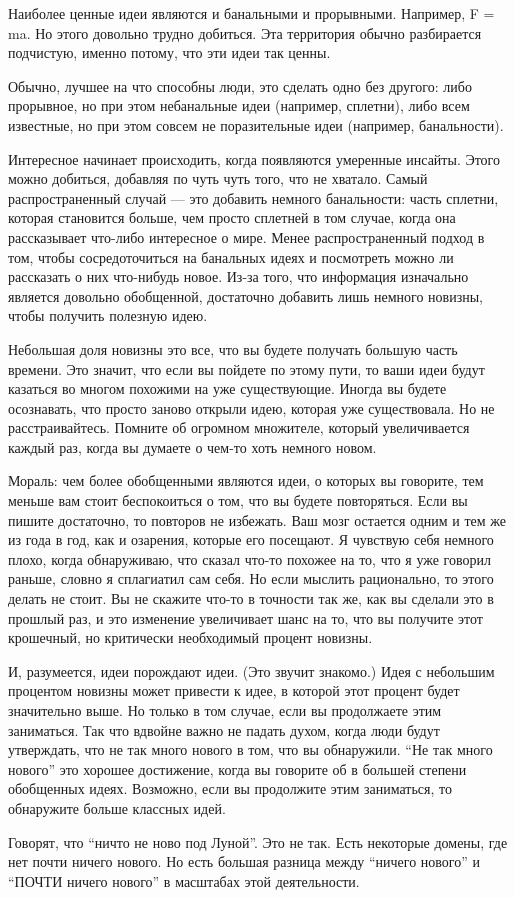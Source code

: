 \documentclass[ebook,12pt,oneside,openany]{memoir}
\date{}
\begin{document}
\maketitle

Наиболее ценные идеи являются и банальными и прорывными. Например, F =
ma. Но этого довольно трудно добиться. Эта территория обычно
разбирается подчистую, именно потому, что эти идеи так ценны.

Обычно, лучшее на что способны люди, это сделать одно без другого:
либо прорывное, но при этом небанальные идеи (например, сплетни), либо
всем известные, но при этом совсем не поразительные идеи (например,
банальности).

Интересное начинает происходить, когда появляются умеренные инсайты.
Этого можно добиться, добавляя по чуть чуть того, что не хватало.
Самый распространенный случай — это добавить немного банальности:
часть сплетни, которая становится больше, чем просто сплетней в том
случае, когда она рассказывает что-либо интересное о мире. Менее
распространенный подход в том, чтобы сосредоточиться на банальных
идеях и посмотреть можно ли рассказать о них что-нибудь новое. Из-за
того, что информация изначально является довольно обобщенной,
достаточно добавить лишь немного новизны, чтобы получить полезную
идею.

Небольшая доля новизны это все, что вы будете получать большую часть
времени. Это значит, что если вы пойдете по этому пути, то ваши идеи
будут казаться во многом похожими на уже существующие. Иногда вы
будете осознавать, что просто заново открыли идею, которая уже
существовала. Но не расстраивайтесь. Помните об огромном множителе,
который увеличивается каждый раз, когда вы думаете о чем-то хоть
немного новом.

Мораль: чем более обобщенными являются идеи, о которых вы говорите,
тем меньше вам стоит беспокоиться о том, что вы будете повторяться.
Если вы пишите достаточно, то повторов не избежать. Ваш мозг остается
одним и тем же из года в год, как и озарения, которые его посещают. Я
чувствую себя немного плохо, когда обнаруживаю, что сказал что-то
похожее на то, что я уже говорил раньше, словно я сплагиатил сам себя.
Но если мыслить рационально, то этого делать не стоит. Вы не скажите
что-то в точности так же, как вы сделали это в прошлый раз, и это
изменение увеличивает шанс на то, что вы получите этот крошечный, но
критически необходимый процент новизны.

И, разумеется, идеи порождают идеи. (Это звучит знакомо.) Идея с
небольшим процентом новизны может привести к идее, в которой этот
процент будет значительно выше. Но только в том случае, если вы
продолжаете этим заниматься. Так что вдвойне важно не падать духом,
когда люди будут утверждать, что не так много нового в том, что вы
обнаружили. “Не так много нового” это хорошее достижение, когда вы
говорите об в большей степени обобщенных идеях. Возможно, если вы
продолжите этим заниматься, то обнаружите больше классных идей.

Говорят, что “ничто не ново под Луной”. Это не так. Есть некоторые
домены, где нет почти ничего нового. Но есть большая разница между
“ничего нового” и “ПОЧТИ ничего нового” в масштабах этой деятельности.
\end{document}
